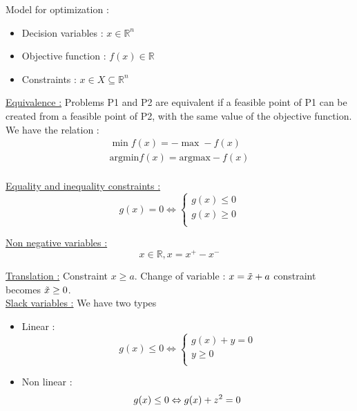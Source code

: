 \documentclass[../main.tex]{subfiles}
\begin{document}
\localtableofcontents
Model for optimization : \begin{itemize}
    \item Decision variables : $x \in \mathbb{R}^n$\\
    \item Objective function : $f(x) \in \mathbb{R}$\\
    \item Constraints : $x \in X \subseteq \mathbb{R}^n$\\
\end{itemize}

\quad \underline{Equivalence :} Problems P1 and P2 are equivalent if a feasible point of P1 can be created from a feasible point of P2, with the same value of the objective function.\\

We have the relation : \begin{equation}
    \begin{split}
        \min f(x) = - \max -f(x)\\
        \text{argmin} f(x) = \text{argmax} -f(x)\\
    \end{split}
\end{equation}

\quad \underline{Equality and inequality constraints :} \begin{equation}
    g(x) = 0 \Leftrightarrow \begin{cases}
        g(x) \leq 0 \\
        g(x) \geq 0\\
    \end{cases}
\end{equation}

\quad \underline{Non negative variables :} \begin{equation}
    x \in \mathbb{R}, x = x^+ - x^-
\end{equation}

\quad \underline{Translation :} Constraint $x \geq a$. Change of variable : $x = \Tilde{x}+a$ constraint becomes $\Tilde{x}\geq 0$.\\

\quad \underline{Slack variables :} We have two types \begin{itemize}
    \item Linear : \begin{equation}
        g(x) \leq 0 \Leftrightarrow \begin{cases}
            g(x) + y =0\\
            y \geq 0\\
        \end{cases}
    \end{equation}
    \item Non linear : \begin{equation}
        g(x)\leq 0 \Leftrightarrow g(x) +z^2 =0\\
    \end{equation}
\end{itemize}
\end{document}
